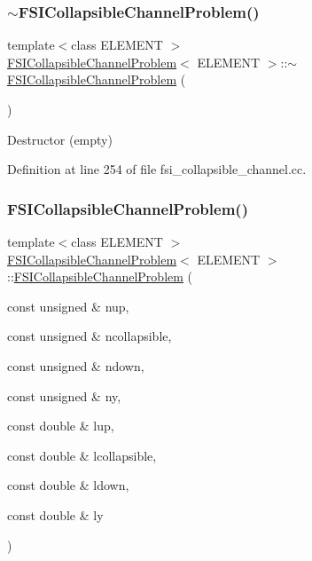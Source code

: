 \subsubsection{\texorpdfstring{$\sim$\+F\+S\+I\+Collapsible\+Channel\+Problem()}{~FSICollapsibleChannelProblem()}\hspace{0.1cm}{\footnotesize\ttfamily [1/4]}}
{\footnotesize\ttfamily template$<$class E\+L\+E\+M\+E\+NT $>$ \\
\hyperlink{classFSICollapsibleChannelProblem}{F\+S\+I\+Collapsible\+Channel\+Problem}$<$ E\+L\+E\+M\+E\+NT $>$\+::$\sim$\hyperlink{classFSICollapsibleChannelProblem}{F\+S\+I\+Collapsible\+Channel\+Problem} (\begin{DoxyParamCaption}{ }\end{DoxyParamCaption})\hspace{0.3cm}{\ttfamily [inline]}}



Destructor (empty) 



Definition at line 254 of file fsi\+\_\+collapsible\+\_\+channel.\+cc.

\mbox{\label{classFSICollapsibleChannelProblem_afe14ae0d2bdfc9a15969c9bdcd6e2512}} 
\subsubsection{\texorpdfstring{F\+S\+I\+Collapsible\+Channel\+Problem()}{FSICollapsibleChannelProblem()}\hspace{0.1cm}{\footnotesize\ttfamily [2/4]}}
{\footnotesize\ttfamily template$<$class E\+L\+E\+M\+E\+NT $>$ \\
\hyperlink{classFSICollapsibleChannelProblem}{F\+S\+I\+Collapsible\+Channel\+Problem}$<$ E\+L\+E\+M\+E\+NT $>$\+::\hyperlink{classFSICollapsibleChannelProblem}{F\+S\+I\+Collapsible\+Channel\+Problem} (\begin{DoxyParamCaption}\item[{const unsigned \&}]{nup,  }\item[{const unsigned \&}]{ncollapsible,  }\item[{const unsigned \&}]{ndown,  }\item[{const unsigned \&}]{ny,  }\item[{const double \&}]{lup,  }\item[{const double \&}]{lcollapsible,  }\item[{const double \&}]{ldown,  }\item[{const double \&}]{ly }\end{DoxyParamCaption})}



